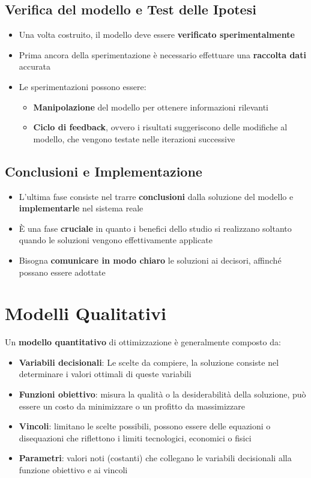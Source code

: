 \subsection{\textbf{Verifica del modello} e \textbf{Test delle Ipotesi}}
\begin{itemize}
    \item Una volta costruito, il modello deve essere \textbf{verificato sperimentalmente}
    \item Prima ancora della sperimentazione è necessario effettuare una \textbf{raccolta dati} accurata
    \item Le sperimentazioni possono essere:
    \begin{itemize}
        \item \textbf{Manipolazione} del modello per ottenere informazioni rilevanti
        \item \textbf{Ciclo di feedback}, ovvero i risultati suggeriscono delle modifiche al modello, che vengono testate nelle iterazioni successive
    \end{itemize}
\end{itemize}

\subsection{\textbf{Conclusioni} e \textbf{Implementazione}}
\begin{itemize}
    \item L'ultima fase consiste nel trarre \textbf{conclusioni} dalla soluzione del modello e \textbf{implementarle} nel sistema reale
    \item È una fase \textbf{cruciale} in quanto i benefici dello studio si realizzano soltanto quando le soluzioni vengono effettivamente applicate
    \item Bisogna \textbf{comunicare in modo chiaro} le soluzioni ai decisori, affinché possano essere adottate
\end{itemize}

\section{Modelli Qualitativi}
Un \textbf{modello quantitativo} di ottimizzazione è generalmente composto da:
\begin{itemize}
    \item \textbf{Variabili decisionali}: Le scelte da compiere, la soluzione consiste nel determinare i valori ottimali di queste variabili
    \item \textbf{Funzioni obiettivo}: misura la qualità o la desiderabilità della soluzione, può essere un costo da minimizzare o un profitto da massimizzare
    \item \textbf{Vincoli}: limitano le scelte possibili, possono essere delle equazioni o disequazioni che riflettono i limiti tecnologici, economici o fisici
    \item \textbf{Parametri}: valori noti (costanti) che collegano le variabili decisionali alla funzione obiettivo e ai vincoli
\end{itemize}

